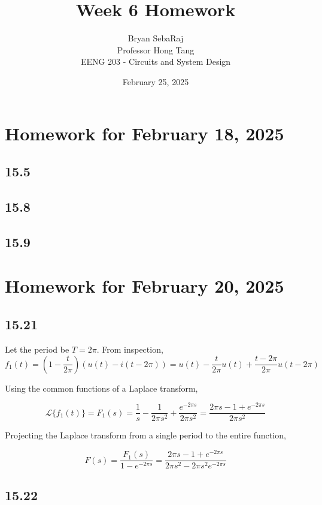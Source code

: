 \documentclass{article}
\title{Week 6 Homework}
\author{Bryan SebaRaj \\[0.7em] Professor Hong Tang \\[0.7em]  EENG 203 - Circuits and System Design}
\date{February 25, 2025}
\begin{document}
\maketitle

\section*{Homework for February 18, 2025}

\subsection*{15.5}

\subsection*{15.8}

\subsection*{15.9}

\section*{Homework for February 20, 2025}

\subsection*{15.21}

Let the period be $T=2\pi$.
From inspection, $$f_1(t) = (1 - \frac{t}{2\pi})(u(t)-i(t-2\pi))=u(t) - \frac{t}{2\pi}u(t) + \frac{t - 2\pi}{2\pi}u(t- 2\pi)$$

Using the common functions of a Laplace transform,

$$\mathcal{L}\{f_1(t)\} = F_1(s) = \frac{1}{s} - \frac{1}{2\pi s^2} + \frac{e^{-2\pi s}}{2\pi s^2} = \frac{2\pi s - 1 + e^{-2\pi s}}{2\pi s^2}$$

Projecting the Laplace transform from a single period to the entire function, 

$$F(s) = \frac{F_1(s)}{1 - e^{-2\pi s}}=\frac{2\pi s - 1 + e^{-2\pi s}}{2\pi s^2 - 2\pi s^2 e^{-2\pi s}}$$

\subsection*{15.22}
\end{document}
